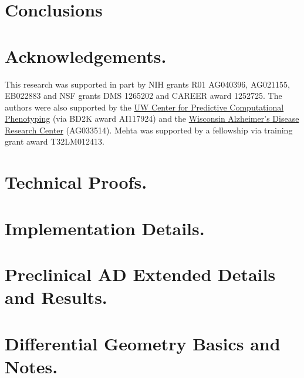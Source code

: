 \documentclass{qam-l}
\theoremstyle{definition}
\theoremstyle{remark}
\numberwithin{equation}{section}
\begin{document}
\section{Conclusions}


\section{Acknowledgements.}
This research was supported in part by NIH grants R01 AG040396, AG021155, EB022883 
	and NSF grants DMS 1265202 and CAREER award 1252725. The authors were also supported by 
	the \href{http://cpcp.wisc.edu/}{UW Center for Predictive Computational Phenotyping} (via BD2K award AI117924) and the 
	\href{http://www.adrc.wisc.edu/}{Wisconsin Alzheimer's Disease Research Center} (AG033514). 
	Mehta was supported by a fellowship via training grant award T32LM012413. 

\appendix
\section{Technical Proofs.}

\section{Implementation Details.}


\section{Preclinical AD Extended Details and Results.}



\clearpage
\section{Differential Geometry Basics and Notes.}
\label{sec:diffgeom}




\end{document}
